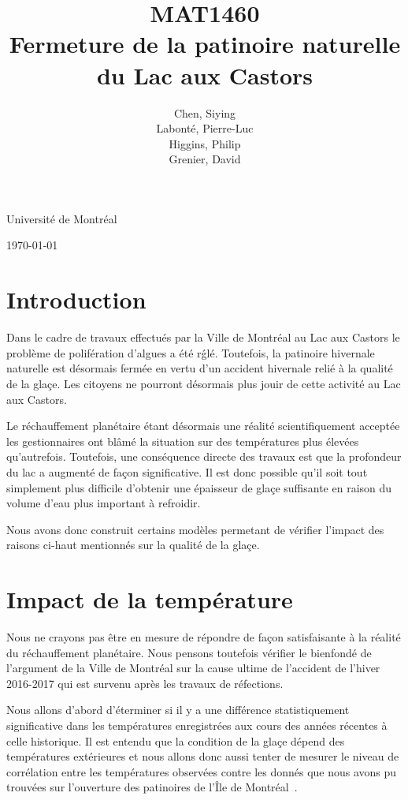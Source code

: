 \documentclass[12pt]{article}
\title{MAT1460\\[3ex]Fermeture de la patinoire naturelle du Lac aux Castors}
\author{Chen, Siying\\[1ex] Labont\'e, Pierre-Luc\\[1ex]Higgins, Philip\\[1ex] Grenier, David}
\date{}
\numberwithin{figure}{section}
\begin{document}
\maketitle
\thispagestyle{empty}
\vfill
\begin{center}
Universit\'e de Montr\'eal

\today
\end{center}
\clearpage

\tableofcontents
\newpage
\section{Introduction}

Dans le cadre de travaux effectu\'es par la Ville de Montr\'eal au Lac aux Castors le probl\`eme de
polif\'eration d'algues a \'et\'e r\'gl\'e. Toutefois, la patinoire hivernale naturelle est
d\'esormais ferm\'ee en vertu d'un accident hivernale reli\'e \`a la qualit\'e de la gla\c ce. Les
citoyens ne pourront d\'esormais plus jouir de cette activit\'e au Lac aux Castors.

Le r\'echauffement plan\'etaire \'etant d\'esormais une r\'ealit\'e scientifiquement accept\'ee les
gestionnaires ont bl\^am\'e la situation sur des temp\'eratures plus \'elev\'ees qu'autrefois.
Toutefois, une cons\'equence directe des travaux est que la profondeur du lac a augment\'e de fa\c
con significative. Il est donc possible qu'il soit tout simplement plus difficile d'obtenir une
\'epaisseur de gla\c ce suffisante en raison du volume d'eau plus important \`a refroidir.

Nous avons donc construit certains mod\`eles permetant de v\'erifier l'impact des raisons
ci-haut mentionn\'es sur la qualit\'e de la gla\c ce.

\section{Impact de la temp\'erature}

Nous ne crayons pas \^etre en mesure de r\'epondre de fa\c con satisfaisante \`a la r\'ealit\'e du
r\'echauffement plan\'etaire. Nous pensons toutefois v\'erifier le bienfond\'e de l'argument de la
Ville de Montr\'eal sur la cause ultime de l'accident de l'hiver 2016-2017 qui est survenu apr\`es
les travaux de r\'efections.

Nous allons d'abord d'\'eterminer si il y a une diff\'erence statistiquement significative dans les
temp\'eratures enregistr\'ees aux cours des ann\'ees r\'ecentes \`a celle historique. Il est entendu
que la condition de la gla\c ce d\'epend des temp\'eratures ext\'erieures et nous allons donc aussi
tenter de mesurer le niveau de corr\'elation entre les temp\'eratures observ\'ees contre les
donn\'es que nous avons pu trouv\'ees sur l'ouverture des patinoires de l'\^Ile de
Montr\'eal~\cite{PatHist}.
\end{document}
